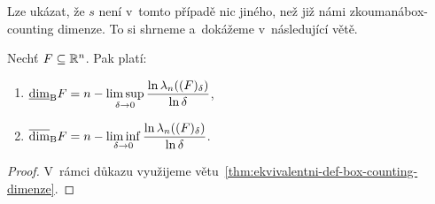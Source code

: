 Lze ukázat, že $s$ není v~tomto případě nic jiného, než již námi zkoumaná\linebreak{}box-counting dimenze. To si shrneme a~dokážeme v~následující větě.
\begin{theorem}\label{thm:bc-dimenze-lebesgueova-mira}
    Nechť $F\subseteq\mathbb{R}^n$. Pak platí: 
    \begin{enumerate}[label=(\roman*)]
        \item $\underline{\dim}_\textup{B}{F}=n-\limsup\limits_{\delta\to 0}\dfrac{\ln{\ensuremath{\lambda_n}((F)_\delta)}}{\ln{\delta}}$,
        \item $\overline{\dim}_\textup{B}{F}=n-\liminf\limits_{\delta\to 0}\dfrac{\ln{\ensuremath{\lambda_n}((F)_\delta)}}{\ln{\delta}}$.
    \end{enumerate}
\end{theorem}
\begin{proof}
    V~rámci důkazu využijeme větu~\ref{thm:ekvivalentni-def-box-counting-dimenze}.


\end{proof}
